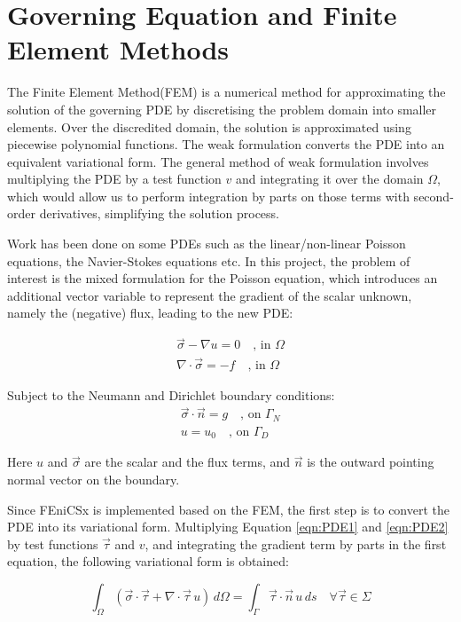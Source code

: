 \section{Governing Equation and Finite Element Methods}
The Finite Element Method(FEM) is a numerical method for approximating the solution of the governing PDE by discretising the problem domain into smaller elements. Over the discredited domain, the solution is approximated using piecewise polynomial functions. The weak formulation converts the PDE into an equivalent variational form. The general method of weak formulation involves multiplying the PDE by a test function $v$ and integrating it over the domain $\Omega$, which would allow us to perform integration by parts on those terms with second-order derivatives, simplifying the solution process.

Work has been done on some PDEs such as the linear/non-linear Poisson equations, the Navier-Stokes equations etc. In this project, the problem of interest is the mixed formulation for the Poisson equation, which introduces an additional vector variable to represent the gradient of the scalar unknown, namely the (negative) flux, leading to the new PDE:

\begin{align}
    \Vec{\sigma} - \nabla u = 0 \quad \text{, in }\Omega    \label{eqn:PDE1}\\  
    \nabla \cdot \Vec{\sigma} = -f \quad \text{, in }\Omega     \label{eqn:PDE2}
\end{align}

Subject to the Neumann  and Dirichlet boundary conditions:
\begin{align}
     \Vec{\sigma}  \cdot \Vec{n} =  g \quad \text{, on }\Gamma_{N} \label{eqn:boundary1} \\
     u = u_0 \quad \text{, on }\Gamma_{D}   \label{eqn:boundary2}
\end{align}

Here $u$ and $\Vec{\sigma}$ are the scalar and the flux terms, and $\Vec{n}$ is the outward pointing normal vector on the boundary.

Since FEniCSx is implemented based on the FEM, the first step is to convert the PDE into its variational form. Multiplying Equation \ref{eqn:PDE1} and \ref{eqn:PDE2} by test functions $\vec{\tau}$ and $v$, and integrating the gradient term by parts in the first equation, the following variational form is obtained:

\begin{equation}
\int_{\Omega} (\vec{\sigma} \cdot \vec{\tau} + \nabla \cdot \vec{\tau} \, u) \, d\Omega = \int_{\Gamma} \vec{\tau} \cdot \vec{n} \, u \, ds \quad \forall \vec{\tau} \in \Sigma
\end{equation}

